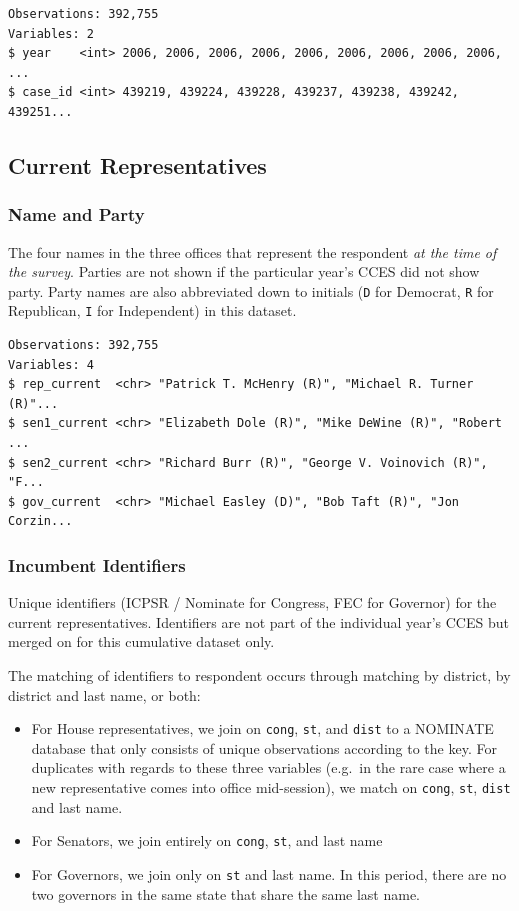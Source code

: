 \documentclass[10pt,article,oneside]{memoir}
\theoremstyle{definition}
\begin{document}
\begin{verbatim}
Observations: 392,755
Variables: 2
$ year    <int> 2006, 2006, 2006, 2006, 2006, 2006, 2006, 2006, 2006, ...
$ case_id <int> 439219, 439224, 439228, 439237, 439238, 439242, 439251...
\end{verbatim}

\subsection{Current Representatives}\label{current-representatives}

\subsubsection{Name and Party}\label{name-and-party}

The four names in the three offices that represent the respondent
\emph{at the time of the survey}. Parties are not shown if the
particular year's CCES did not show party. Party names are also
abbreviated down to initials (\texttt{D} for Democrat, \texttt{R} for
Republican, \texttt{I} for Independent) in this dataset.

\begin{verbatim}
Observations: 392,755
Variables: 4
$ rep_current  <chr> "Patrick T. McHenry (R)", "Michael R. Turner (R)"...
$ sen1_current <chr> "Elizabeth Dole (R)", "Mike DeWine (R)", "Robert ...
$ sen2_current <chr> "Richard Burr (R)", "George V. Voinovich (R)", "F...
$ gov_current  <chr> "Michael Easley (D)", "Bob Taft (R)", "Jon Corzin...
\end{verbatim}

\subsubsection{Incumbent Identifiers}\label{incumbent-identifiers}

Unique identifiers (ICPSR / Nominate for Congress, FEC for Governor) for
the current representatives. Identifiers are not part of the individual
year's CCES but merged on for this cumulative dataset only.

The matching of identifiers to respondent occurs through matching by
district, by district and last name, or both:

\begin{itemize}
\tightlist
\item
  For House representatives, we join on \texttt{cong}, \texttt{st}, and
  \texttt{dist} to a NOMINATE database that only consists of unique
  observations according to the key. For duplicates with regards to
  these three variables (e.g.~in the rare case where a new
  representative comes into office mid-session), we match on
  \texttt{cong}, \texttt{st}, \texttt{dist} and last name.
\item
  For Senators, we join entirely on \texttt{cong}, \texttt{st}, and last
  name
\item
  For Governors, we join only on \texttt{st} and last name. In this
  period, there are no two governors in the same state that share the
  same last name.
\end{itemize}
\end{document}
